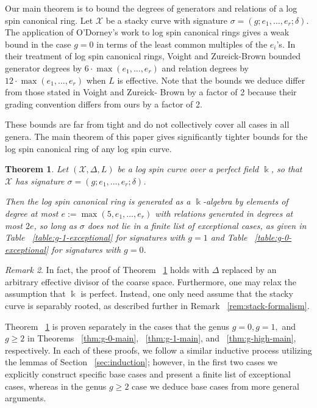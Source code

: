 \documentclass{amsart}
\theoremstyle{plain}
\newtheorem{thm}{Theorem}[section]
\theoremstyle{definition}
\theoremstyle{remark}
\newtheorem{rem}[thm]{Remark}
\numberwithin{equation}{section}
\newcommand\Bk{{\Bbbk}}
\newcommand\sx{\mathscr X}
\newcommand{\halfcan}{L}
\begin{document}
Our main theorem is to bound the degrees of generators and relations of
a log spin canonical ring. Let $\sx$ be a stacky curve with
signature $\sigma = (g; e_1, \ldots, e_r; \delta)$. The application
of O'Dorney's work \cite[Chapter 5]{dorney:canonical} to log spin
canonical rings gives a weak bound in the case $g = 0$ in terms of
the least common multiples of the $e_i$'s. In their treatment of
log spin canonical rings, Voight and Zureick-Brown
\cite[Corollary 10.4.6]{vzb:stacky} bounded generator degrees by $6
\cdot \max(e_1, \ldots, e_r)$ and relation degrees by $12 \cdot \max
(e_1, \ldots, e_ r)$ when $\halfcan$ is effective. Note that the
bounds we deduce differ from those stated in Voight and Zureick-
Brown \cite[Corollary 10.4.6]{vzb:stacky} by a factor of 2 because
their grading convention differs from ours by a factor of 2.

These bounds are far from tight and do not collectively
cover all cases in all genera. The main theorem of this paper
gives significantly tighter bounds for the log spin canonical ring
of any log spin curve.

\begin{thm}
\label{thm:main}
Let $(\sx, \Delta, \halfcan)$ be a log spin curve over a perfect
field $\Bk$, so that $\sx$ has signature $\sigma = (g; e_1, \ldots,
e_r; \delta)$.

Then the log spin canonical ring is generated as a $\Bk$-algebra by 
elements of degree at most $e := \max(5, e_1, \ldots, e_r)$ with
relations generated in degrees at most $2e$,
so long as $\sigma$ does not lie in a finite list of exceptional
cases, as given in Table ~\ref{table:g-1-exceptional} for
signatures with $g = 1$ and Table ~\ref{table:g-0-exceptional} for
signatures with $g = 0$.
\end{thm}

\begin{rem}
\label{rem:main-weaker-assumptions}
In fact, the proof of Theorem ~\ref{thm:main} holds with $\Delta$ replaced by an arbitrary effective divisor of the coarse space.
 Furthermore, one may relax the assumption that $\Bk$ is perfect. Instead, one only need assume that the stacky curve
is separably rooted, as described further in Remark ~\ref{rem:stack-formalism}.
\end{rem}

Theorem ~\ref{thm:main} is proven separately in the cases that the genus $g = 0, g = 1,$ and $g \geq 2$ in Theorems ~\ref{thm:g-0-main}, ~\ref{thm:g-1-main}, and ~\ref{thm:g-high-main}, respectively.  In each of these proofs, we follow a similar inductive process utilizing the lemmas of Section ~\ref{sec:induction}; however, in the first two cases we explicitly construct specific base cases and present a finite list of exceptional cases, whereas in the genus $g \geq 2$ case we deduce base cases from more general arguments.
\end{document}
